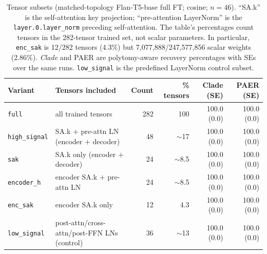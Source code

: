 \documentclass{article}
\theoremstyle{definition}
\theoremstyle{plain}
\begin{document}
\begin{table}[h]
\caption{Tensor subsets (matched-topology Flan-T5-base full FT; cosine; $n=46$). ``SA.k'' is the self-attention key projection;
``pre-attention LayerNorm'' is the \texttt{layer.0.layer\_norm} preceding self-attention. The table's
percentages count tensors in the 282-tensor trained set, not scalar parameters. In particular,
\texttt{enc\_sak} is 12/282 tensors (4.3\%) but 7,077,888/247,577,856 scalar weights (2.86\%).
\emph{Clade} and PAER are polytomy-aware recovery percentages with SEs over the same runs.
\texttt{low\_signal} is the predefined LayerNorm control subset.}
\label{tab:layer_subsets}
\centering
\scriptsize
\setlength{\tabcolsep}{2pt}
\begin{tabular}{llrrrr}
\toprule
Variant & Tensors included & Count & \% tensors & Clade (SE) & PAER (SE) \\
\midrule
\texttt{full}         & all trained tensors                                   & 282 & 100          & 100.0 (0.0) & 100.0 (0.0) \\
\texttt{high\_signal} & SA.k $+$ pre-attn LN (encoder $+$ decoder)            & 48  & $\sim$17     & 100.0 (0.0) & 100.0 (0.0) \\
\texttt{sak}          & SA.k only (encoder $+$ decoder)                       & 24  & $\sim$8.5    & 100.0 (0.0) & 100.0 (0.0) \\
\texttt{encoder\_h}   & encoder SA.k $+$ pre-attn LN                          & 24  & $\sim$8.5    & 100.0 (0.0) & 100.0 (0.0) \\
\texttt{enc\_sak}     & encoder SA.k only                                     & 12  & 4.3           & 100.0 (0.0) & 100.0 (0.0) \\
\texttt{low\_signal}  & post-attn/cross-attn/post-FFN LNs (control)           & 36 & $\sim$13 & 100.0 (0.0) & 100.0 (0.0) \\
\bottomrule
\end{tabular}
\end{table}
\end{document}
